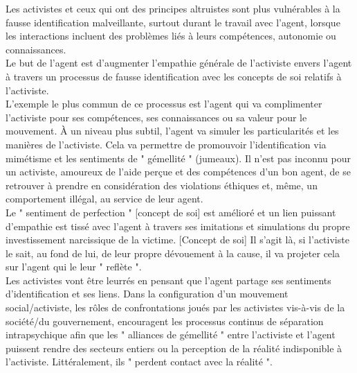 \documentclass[11pt,twoside,a4paper]{article}
\begin{document}
Les activistes et ceux qui ont des principes altruistes sont plus vuln{\'e}rables {\`a} la fausse identification malveillante, surtout durant le travail avec l'agent, lorsque les interactions incluent des probl{\`e}mes li{\'e}s {\`a} leurs comp{\'e}tences, autonomie ou connaissances.~\\

Le but de l'agent est d'augmenter l'empathie g{\'e}n{\'e}rale de l'activiste envers l'agent {\`a} travers un processus de fausse identification avec les concepts de soi relatifs {\`a} l'activiste.~\\

L'exemple le plus commun de ce processus est l'agent qui va complimenter l'activiste pour ses comp{\'e}tences, ses connaissances ou sa valeur pour le mouvement. {\`A} un niveau plus subtil, l'agent va simuler les particularit{\'e}s et les mani{\`e}res de l'activiste. Cela va permettre de promouvoir l'identification via mim{\'e}tisme et les sentiments de " g{\'e}mellit{\'e} " (jumeaux). Il n'est pas inconnu pour un activiste, amoureux de l'aide per\c{c}ue et des comp{\'e}tences d'un bon agent, de se retrouver {\`a} prendre en consid{\'e}ration des violations {\'e}thiques et, m{\^e}me, un comportement ill{\'e}gal, au service de leur agent.~\\

Le " sentiment de perfection " [concept de soi] est am{\'e}lior{\'e} et un lien puissant d'empathie est tiss{\'e} avec l'agent {\`a} travers ses imitations et simulations du propre investissement narcissique de la victime. [Concept de soi] Il s'agit l{\`a}, si l'activiste le sait, au fond de lui, de leur propre d{\'e}vouement {\`a} la cause, il va projeter cela sur l'agent qui le leur " refl{\`e}te ".~\\

Les activistes vont {\^e}tre leurr{\'e}s en pensant que l'agent partage ses sentiments d'identification et ses liens. Dans la configuration d'un mouvement social/activiste, les r{\^o}les de confrontations jou{\'e}s par les activistes vis-{\`a}-vis de la soci{\'e}t{\'e}/du gouvernement, encouragent les processus continus de s{\'e}paration intrapsychique afin que les " alliances de g{\'e}mellit{\'e} " entre l'activiste et l'agent puissent rendre des secteurs entiers ou la perception de la r{\'e}alit{\'e} indisponible {\`a} l'activiste. Litt{\'e}ralement, ils " perdent contact avec la r{\'e}alit{\'e} ". ~\\

\vfill
\clearpage
\end{document}
